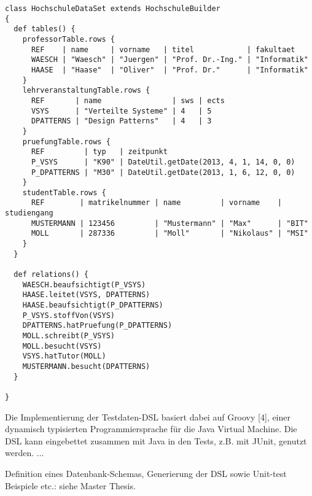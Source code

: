 \begin{lstlisting}[caption=DataSet modelliert mit dem Table Builder API, label=listing:hochschuledataset:table]
class HochschuleDataSet extends HochschuleBuilder
{
  def tables() {
    professorTable.rows {
      REF    | name     | vorname   | titel            | fakultaet
      WAESCH | "Waesch" | "Juergen" | "Prof. Dr.-Ing." | "Informatik"
      HAASE  | "Haase"  | "Oliver"  | "Prof. Dr."      | "Informatik"
    }
    lehrveranstaltungTable.rows {
      REF       | name                | sws | ects
      VSYS      | "Verteilte Systeme" | 4   | 5
      DPATTERNS | "Design Patterns"   | 4   | 3
    }
    pruefungTable.rows {
      REF         | typ   | zeitpunkt
      P_VSYS      | "K90" | DateUtil.getDate(2013, 4, 1, 14, 0, 0)
      P_DPATTERNS | "M30" | DateUtil.getDate(2013, 1, 6, 12, 0, 0)
    }
    studentTable.rows {
      REF        | matrikelnummer | name         | vorname    | studiengang
      MUSTERMANN | 123456         | "Mustermann" | "Max"      | "BIT"      
      MOLL       | 287336         | "Moll"       | "Nikolaus" | "MSI"      
    }
  }

  def relations() {
    WAESCH.beaufsichtigt(P_VSYS)
    HAASE.leitet(VSYS, DPATTERNS)
    HAASE.beaufsichtigt(P_DPATTERNS)
    P_VSYS.stoffVon(VSYS)
    DPATTERNS.hatPruefung(P_DPATTERNS)
    MOLL.schreibt(P_VSYS)
    MOLL.besucht(VSYS)
    VSYS.hatTutor(MOLL)
    MUSTERMANN.besucht(DPATTERNS)
  }

}
\end{lstlisting}


Die Implementierung der Testdaten-DSL basiert dabei auf Groovy [4], einer dynamisch typisierten Programmiersprache für die Java Virtual Machine. Die DSL kann eingebettet zusammen mit Java in den Tests, z.B. mit JUnit, genutzt werden.
...

Definition eines Datenbank-Schemas, Generierung der DSL sowie Unit-test Beispiele etc.: siehe Master Thesis.



%
%
%
%	
%	
%	
%	
%
%	
%	
%	
%	
%	
	
